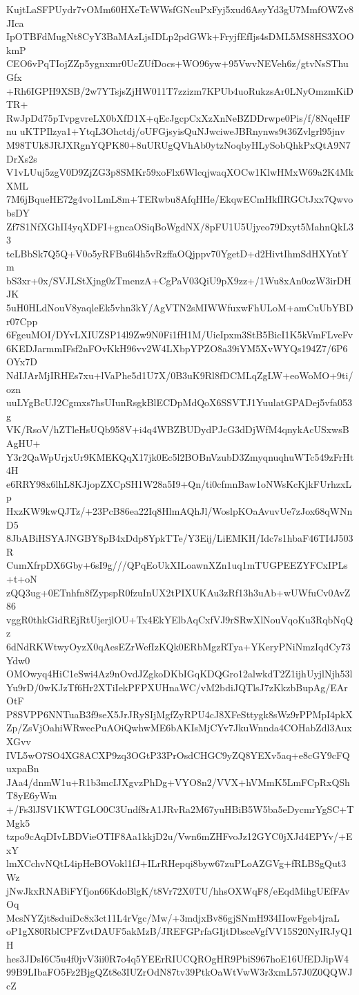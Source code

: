 KujtLaSFPUydr7vOMm60HXeTcWWsfGNcuPxFyj5xud6AsyYd3gU7MmfOWZv8JIca
IpOTBFdMugNt8CyY3BaMAzLjsIDLp2pdGWk+FryjfEfIjs4sDML5MS8HS3XOOkmP
CEO6vPqTIojZZp5ygnxmr0UcZUfDocs+WO96yw+95VwvNEVeh6z/gtvNsSThuGfx
+Rh6IGPH9XSB/2w7YTsjsZjHW011T7zzizm7KPUb4uoRukzsAr0LNyOmzmKiDTR+
RwJpDd75pTvpgvreLX0bXfD1X+qEcJgcpCxXzXnNeBZDDrwpe0Pis/f/8NqeHFnu
uKTPIlzya1+YtqL3Ohctdj/oUFGjsyisQuNJwciweJBRnynws9t36Zvlgrl95jnv
M98TUk8JRJXRgnYQPK80+8uURUgQVhAb0ytzNoqbyHLySobQhkPxQtA9N7DrXs2s
V1vLUuj5zgV0D9ZjZG3p8SMKr59xoFlx6WlcqjwaqXOCw1KlwHMxW69a2K4MkXML
7M6jBqueHE72g4vo1LmL8m+TERwbu8AfqHHe/EkqwECmHkfIRGCtJxx7QwvobsDY
Zf7S1NfXGhII4yqXDFI+gncaOSiqBoWgdNX/8pFU1U5Ujyeo79Dxyt5MahnQkL33
teLBbSk7Q5Q+V0o5yRFBu6l4h5vRzffaOQjppv70YgetD+d2HivtIhmSdHXYntYm
bS3xr+0x/SVJLStXjng0zTmenzA+CgPaV03QiU9pX9zz+/1Wu8xAn0ozW3irDHJK
5uH0HLdNouV8yaqleEk5vhn3kY/AgVTN2sMIWWfuxwFhULoM+amCuUbYBDr07Cpp
6FgeuMOI/DYvLXIUZSP14l9Zw9N0Fi1fH1M/UieIpxm3StB5BicI1K5kVmFLveFv
6KEDJarmmIFsf2nFOvKkH96vv2W4LXbpYPZO8a39iYM5XvWYQs194Z7/6P6OYx7D
NdIJArMjIRHEs7xu+lVaPhe5d1U7X/0B3uK9Rl8fDCMLqZgLW+eoWoMO+9ti/ozn
uuLYgBcUJ2Cgmxs7hsUIunRsgkBlECDpMdQoX6SSVTJ1YuulatGPADej5vfa053g
VK/RsoV/hZTleHsUQb958V+i4q4WBZBUDydPJcG3dDjWfM4qnykAcUSxwsBAgHU+
Y3r2QaWpUrjxUr9KMEKQqX17jk0Ec5l2BOBnVzubD3ZmyqnuqhuWTc549zFrHt4H
e6RRY98x6lhL8KJjopZXCpSH1W28a5I9+Qn/ti0cfmnBaw1oNWsKcKjkFUrhzxLp
HxzKW9kwQJTz/+23PcB86ea22Iq8HlmAQhJl/WoslpKOaAvuvUe7zJox68qWNnD5
8JbABiHSYAJNGBY8pB4xDdp8YpkTTe/Y3Eij/LiEMKH/Idc7s1hbaF46TI4J503R
CumXfrpDX6Gby+6sI9g///QPqEoUkXILoawnXZn1uq1mTUGPEEZYFCxIPLs+t+oN
zQQ3ug+0ETnhfn8fZypspR0fzuInUX2tPIXUKAu3zRf13h3uAb+wUWfuCv0AvZ86
vggR0thkGidREjRtUjerjlOU+Tx4EkYElbAqCxfVJ9rSRwXlNouVqoKu3RqbNqQz
6dNdRKWtwyOyzX0qAesEZrWefIzKQk0ERbMgzRTya+YKeryPNiNmzIqdCy73Ydw0
OMOwyq4HiC1eSwi4Az9nOvdJZgkoDKbIGqKDQGro12alwkdT2Z1ijhUyjlNjh53l
Yu9rD/0wKJzTf6Hr2XTiIekPFPXUHnaWC/vM2bdiJQTlsJ7zKkzbBupAg/EArOtF
P8SVPP6NNTuaB3f9seX5JrJRySIjMgfZyRPU4cJ8XFeSttygk8sWz9rPPMpI4pkX
Zp/ZsVjOahiWRwecPuAOiQwhwME6bAKIsMjCYv7JkuWnnda4COHabZdl3AuxXGvv
IVL5wO7SO4XG8ACXP9zq3OGtP33PrOsdCHGC9yZQ8YEXv5aq+e8cGY9cFQuxpaBn
JAa4/dnmW1u+R1b3mcIJXgvzPhDg+VYO8n2/VVX+hVMmK5LmFCpRxQShT8yE6yWm
+/Fs3lJSV1KWTGLO0C3Undf8rA1JRvRa2M67yuHBiB5W5ba5eDycmrYgSC+TMgk5
tzpo9cAqDIvLBDVieOTIF8Aa1kkjD2u/Vwn6mZHFvoJz12GYC0jXJd4EPYv/+ExY
lmXCchvNQtL4ipHeBOVokl1fJ+ILrRHepqi8byw67zuPLoAZGVg+fRLBSgQut3Wz
jNwJkxRNABiFYfjon66KdoBlgK/t8Vr72X0TU/hhsOXWqF8/eEqdMihgUEfFAvOq
McsNYZjt8sduiDc8x3ct11L4rVgc/Mw/+3mdjxBv86gjSNmH934IIowFgeb4jraL
oP1gX80RblCPFZvtDAUF5akMzB/JREFGPrfaGIjtDbsceVgfVV15S20NyIRJyQ1H
hes3JDsI6C5u4f0jvV3ii0R7o4q5YEErRIUCQROgHR9PbiS967hoE16UfEDJipW4
99B9LIbaFO5Fz2BjgQZt8e3IUZrOdN87tv39PtkOaWtVwW3r3xmL57J0Z0QQWJcZ

